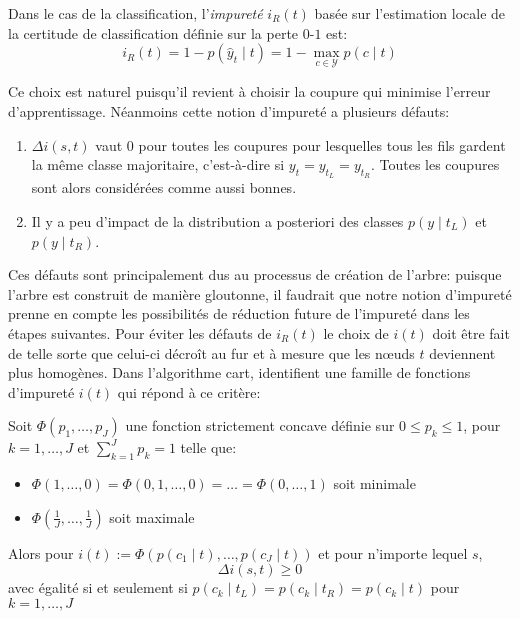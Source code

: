 \begin{definition}
    Dans le cas de la classification, l'\emph{impureté} $i_R (t)$ basée sur l'estimation locale de la certitude de classification définie sur la perte $0$-$1$ est:
    \begin{equation*}
        i_R (t) = 1 - p(\hat{y}_t \mid t ) = 1 - \max_{c \in \mathcal{Y}} p(c\mid t)
    \end{equation*}
\end{definition}
Ce choix est naturel puisqu’il revient à choisir la coupure qui minimise l'erreur d'apprentissage. Néanmoins cette notion d'impureté a plusieurs défauts:
\begin{enumerate}
    \item $\Delta i(s,t)$ vaut $0$ pour toutes les coupures pour lesquelles tous les fils gardent la même classe majoritaire, c'est-à-dire si $y_t = y_{t_L} = y_{t_R}$. Toutes les coupures sont alors considérées comme aussi bonnes.
    \item Il y a peu d'impact de la distribution a posteriori des classes $p(y\mid t_L)$ et $p(y\mid t_R)$.
\end{enumerate}
Ces défauts sont principalement dus au processus de création de l'arbre: puisque l'arbre est construit de manière gloutonne, il faudrait que notre notion d'impureté prenne en compte les possibilités de réduction future de l'impureté dans les étapes suivantes. Pour éviter les défauts de $i_R (t)$ le choix de $i(t)$ doit être fait de telle sorte que celui-ci décroît au fur et à mesure que les nœuds $t$ deviennent plus homogènes. Dans l'algorithme \ac{cart}, \citet{Breiman1984a} identifient une famille de fonctions d'impureté $i(t)$ qui répond à ce critère:
\begin{theoreme}
\label{impurete}
    Soit $\Phi (p_1,\dotsc,p_J)$ une fonction strictement concave définie sur $0 \leq p_k \leq 1$, pour $k=1,\dotsc,J$ et $\sum_{k=1}^J p_k = 1$ telle que:
    \begin{itemize}
        \item $\Phi (1,\dotsc,0) = \Phi (0,1,\dotsc,0) = \dots = \Phi ( 0,\dotsc,1)$ soit minimale
        \item $\Phi \left(\frac{1}{J},\dotsc,\frac{1}{J} \right)$ soit maximale
    \end{itemize}
    Alors pour $i(t) := \Phi \left( p(c_1 \mid t), \dotsc, p(c_J \mid t) \right)$ et pour n'importe lequel $s$,
    \begin{equation*}
        \Delta i(s,t) \geq 0
    \end{equation*}
    avec égalité si et seulement si $p(c_k \mid t_L) = p(c_k \mid t_R) = p(c_k \mid t)$ pour $k=1,\dotsc,J$
\end{theoreme}
